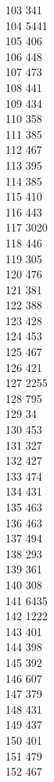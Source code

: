 { 103	341 \\
 104	5441 \\
 105	406 \\
 106	448 \\
 107	473 \\
 108	441 \\
 109	434 \\
 110	358 \\
 111	385 \\
 112	467 \\
 113	395 \\
 114	385 \\
 115	410 \\
 116	443 \\
 117	3020 \\
 118	446 \\
 119	305 \\
 120	476 \\
 121	381 \\
 122	388 \\
 123	428 \\
 124	453 \\
 125	467 \\
 126	421 \\
 127	2255 \\
 128	795 \\
 129	34 \\
 130	453 \\
 131	327 \\
 132	427 \\
 133	474 \\
 134	431 \\
 135	463 \\
 136	463 \\
 137	494 \\
 138	293 \\
 139	361 \\
 140	308 \\
 141	6435 \\
 142	1222 \\
 143	401 \\
 144	398 \\
 145	392 \\
 146	607 \\
 147	379 \\
 148	431 \\
 149	437 \\
 150	401 \\
 151	479 \\
 152	467 \\
}
